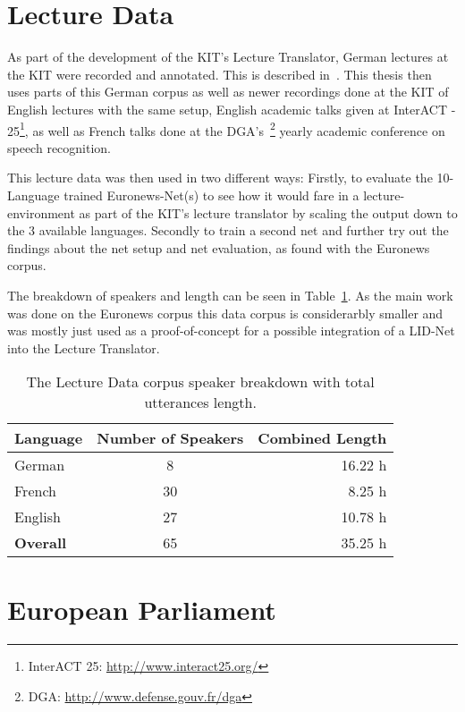\newpage
\section{Lecture Data}
\label{sec:LITasks:Lecture}

As part of the development of the KIT's Lecture Translator, German lectures at the KIT were recorded and annotated. This is described in~\cite{stuker2012kit}. This thesis then uses parts of this German corpus as well as newer recordings done at the KIT of English lectures with the same setup, English academic talks given at InterACT - 25\footnote{InterACT 25: \url{http://www.interact25.org/}}, as well as French talks done at the DGA's~\footnote{DGA: \url{http://www.defense.gouv.fr/dga}} yearly academic conference on speech recognition. 

This lecture data was then used in two different ways: Firstly, to evaluate the 10-Language trained Euronews-Net(s) to see how it would fare in a lecture-environment as part of the KIT's lecture translator by scaling the output down to the 3 available languages. Secondly to train a second net and further try out the findings about the net setup and net evaluation, as found with the Euronews corpus.

The breakdown of speakers and length can be seen in Table~\ref{tab:spkDataLD}. As the main work was done on the Euronews corpus this data corpus is considerarbly smaller and was mostly just used as a proof-of-concept for a possible integration of a LID-Net into the Lecture Translator. 
\begin{table}[h!]
\label{tab:spkDataLD}
\centering
\begin{tabular}{| l | c | r | }
	\hline
	\textbf{Language} & \textbf{Number of Speakers} & \textbf{Combined Length} \\
	\hline
	German & 8 &  16.22 h \\
	French & 30 & 8.25 h \\  
	English & 27 & 10.78 h \\ 
	\hline
	\textbf{Overall} & 65 & 35.25 h\\
	\hline
	
\end{tabular}
\caption{The Lecture Data corpus speaker breakdown with total utterances length.}
\end{table}

\section{European Parliament}
\label{sec:LITasks:EU}


